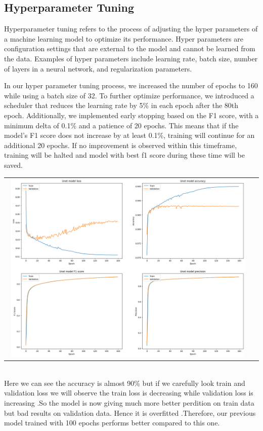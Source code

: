 \documentclass[12pt,a4paper]{report}
\begin{document}
    		\label{Hyperparameter Tuning}
		\subsection{Hyperparameter Tuning}Hyperparameter tuning \cite{hyper}  refers to the process of adjusting the hyper parameters of a machine learning model to optimize its performance. Hyper parameters are configuration settings that are external to the model and cannot be learned from the data. Examples of hyper parameters include learning rate, batch size, number of layers in a neural network, and regularization parameters.
		
	In our hyper parameter tuning process, we increased the number of epochs to 160 while using a batch size of 32. To further optimize performance, we introduced a scheduler that reduces the learning rate by 5\% in each epoch after the 80th epoch. Additionally, we implemented early stopping based on the F1 score, with a minimum delta of 0.1\% and a patience of 20 epochs. This means that if the model's F1 score does not increase by at least 0.1\%, training will continue for an additional 20 epochs. If no improvement is observed within this timeframe, training will be halted and model with best f1 score during these time will be saved.	
		 \\
		 \begin{tabular}{c c}
 \includegraphics[width=0.97\textwidth]{160epoch}
    \end{tabular}
    \\
    Here we can see the accuracy is almost 90\% but if we carefully look train and validation loss we will observe the train loss is decreasing while validation loss is increasing .So the model is now giving much more better perdition on train data but bad results on validation data. Hence it is overfitted .Therefore, our previous model trained with 100 epochs performs better compared to this one. \\
		 
\end{document}
